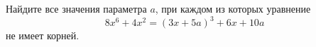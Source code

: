 \begin{ex}
	\begin{condition}
		Найдите все значения параметра \( a \), при каждом из которых уравнение \[ 8x^6+4x^2=(3x+5a)^3+6x+10a \] не имеет корней.
	\end{condition}
\end{ex}